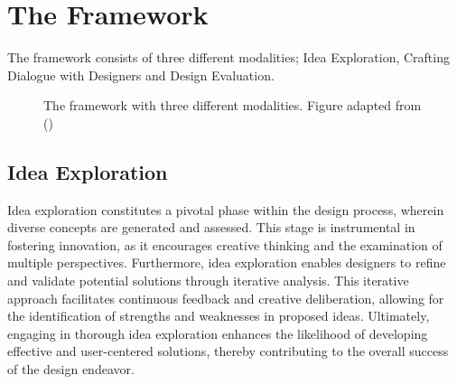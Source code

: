 \documentclass{article}
\begin{document}
\section{The Framework}
The framework consists of three different modalities; Idea Exploration, Crafting Dialogue with Designers and Design Evaluation.

\begin{figure*}[!htb]
    \centering
    \caption{The framework with three different modalities. Figure adapted from (\cite{takeda1990modeling})}
    \label{fig:enter-label3}
\end{figure*}

\subsection{Idea Exploration}
Idea exploration constitutes a pivotal phase within the design process, wherein diverse concepts are generated and assessed. This stage is instrumental in fostering innovation, as it encourages creative thinking and the examination of multiple perspectives. Furthermore, idea exploration enables designers to refine and validate potential solutions through iterative analysis. This iterative approach facilitates continuous feedback and creative deliberation, allowing for the identification of strengths and weaknesses in proposed ideas. Ultimately, engaging in thorough idea exploration enhances the likelihood of developing effective and user-centered solutions, thereby contributing to the overall success of the design endeavor.
\end{document}
